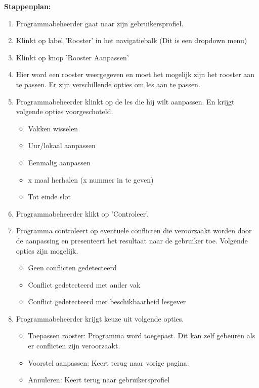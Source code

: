\textbf{Stappenplan:}
	\begin{enumerate}
	\item Programmabeheerder gaat naar zijn gebruikersprofiel.
	\item Klinkt op label 'Rooster' in het navigatiebalk (Dit is een dropdown menu)
	\item Klinkt op knop 'Rooster Aanpassen'
	\item Hier word een rooster weergegeven en moet het mogelijk zijn het rooster aan te passen. Er zijn verschillende opties om les aan te passen.
	\item Programmabeheerder klinkt op de les die hij wilt aanpassen. En krijgt volgende opties voorgeschoteld.
		\begin{itemize}
		\item Vakken wisselen
		\item Uur/lokaal aanpassen
		\item Eenmalig aanpassen 
		\item x maal herhalen (x nummer in te geven) 
		\item Tot einde slot 
		\end{itemize}
	\item Programmabeheerder klikt op 'Controleer'.
	\item Programma controleert op eventuele conflicten die veroorzaakt worden door de aanpassing en presenteert het resultaat naar de gebruiker toe. Volgende opties zijn mogelijk.
		\begin{itemize}
		\item Geen conflicten gedetecteerd
		\item Conflict gedetecteerd met ander vak 
		\item Conflict gedetecteerd met beschikbaarheid lesgever
		\end{itemize}
	\item Programmabeheerder krijgt keuze uit volgende opties.
		\begin{itemize}
		\item Toepassen rooster: Programma word toegepast. Dit kan zelf gebeuren als er conflicten zijn veroorzaakt.
		\item Voorstel aanpassen: Keert terug naar vorige pagina.
		\item Annuleren: Keert terug naar gebruikersprofiel 
		\end{itemize}
	\end{enumerate}	
		
